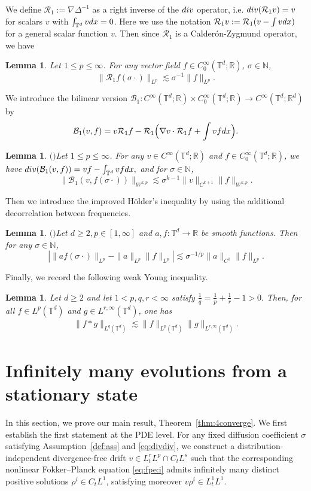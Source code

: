 \documentclass[10pt,a4paper]{amsart}
\numberwithin{equation}{section}
\newtheorem{lemma}[theorem]{Lemma}
\def\({{\Big(}}
\def\){{\Big)}}
\def\dif{{\mathord{{\rm d}}}}
\def\geq{\geqslant}
\def\leq{\leqslant}
\def\div{\mathord{{\rm div}}}
\def\({{\Big(}}
\def\){{\Big)}}
\def\dif{{\mathord{{\rm d}}}}
\def\bl{\begin{lemma}}
\def\el{\end{lemma}}
\def\geq{\geqslant}
\def\leq{\leqslant}
\def\div{\mathord{{\rm div}}}
\begin{document}
 We define $\mathcal{R}_1:=\nabla\Delta^{-1}$ as a right
inverse of the $\div$ operator, i.e. $\div(\mathcal{R}_1v) = v$ for scalars $v$ with $\int_{\mathbb{T}^d} v\dif x = 0$.   Here we use the notation  $\mathcal{R}_1v:=\mathcal{R}_1(v-\int v\dif x)$ for a general scalar function $v$. Then  since $\mathcal{R}_1$ is a Calder\'on-Zygmund operator, we have 
\bl\label{bb_1}
 Let $1\leq p \leq\infty$. For any vector field 
$f \in C_0^\infty(\mathbb{T}^d; \mathbb{R})$, $\sigma\in\mathbb{N}$,
$$\|\mathcal{R}_1f(\sigma\cdot)\|_{ L^p}\lesssim\sigma^{-1} \| f\|_{ L^p}.$$
\el
We introduce the  bilinear version $\mathcal{B}_1: C^\infty(\mathbb{T}^d; \mathbb{R}) \times C_0^\infty(\mathbb{T}^d; \mathbb{R})\to C^\infty(\mathbb{T}^d; \mathbb{R}^{d})$  by $$\mathcal{B}_1(v,f)=v\mathcal{R}_1f-\mathcal{R}_1\(\nabla v\cdot\mathcal{R}_{1}f+\int vf\dif x\).$$

\bl$($\cite[Lemma 3.3]{BCDL21}$)$\label{bb1_1}
Let $1 \leq p \leq\infty$. For any $v \in C^\infty(\mathbb{T}^d; \mathbb{R})$ and $f\in C_0^\infty(\mathbb{T}^d; \mathbb{R})$, we have $\div(\mathcal{B}_1(v,f))=vf-\int_{\mathbb{T}^d}vf\dif x,$ and  for $\sigma\in\mathbb{N}$,
$$\|\mathcal{B}_1(v,f(\sigma\cdot))\|_{W^{k,p}}\lesssim\sigma^{k-1}\|v\|_{C^{k+1}}\|f\|_{W^{k,p}}.$$
\el 




 Then we introduce the improved H\"older’s inequality  by using the additional decorrelation between frequencies.
\bl$($\cite[Theorem B.1]{CL22}$)$\label{ihiot}
Let $d\geq2,p \in [1, \infty]$ and $a, f : \mathbb{T}^d \to \mathbb{R}$ be smooth functions. Then for any $\sigma\in\mathbb{N}$,
$$| \|a f(\sigma\cdot)\|_{L^p}-\|a\|_{L^p}\|f\|_{L^p} |\lesssim\sigma^{-1/p}\|a\|_{C^1}\|f\|_{L^p}.$$
\el


Finally, we record the following weak Young inequality.

\begin{lemma} \label{lem:weak-young}
Let $d\geq 2$ and let $1<p,q,r<\infty$ satisfy
$
\frac1q=\frac1p+\frac1r-1>0 .
$
Then, for all $f\in L^p(\mathbb{T}^d)$ and
$g\in L^{r,\infty}(\mathbb{T}^d)$, one has
\begin{align}
\|f*g\|_{L^q(\mathbb{T}^d)}
\lesssim
\|f\|_{L^p(\mathbb{T}^d)}
\|g\|_{L^{r,\infty}(\mathbb{T}^d)} .
\label{eq:hls}
\end{align}
\end{lemma}

\section{Infinitely many evolutions from a stationary state}\label{cogpss3}
In this section, we prove our main result, Theorem~\ref{thm:4converge}. 
We first establish the first statement at the PDE level. 
For any fixed diffusion coefficient $\sigma$ satisfying Assumption~\ref{def:ass} and \eqref{eq:divdiv}, we construct a distribution-independent divergence-free drift $v \in L^r_tL^p \cap C_tL^s$ 
such that the corresponding nonlinear Fokker--Planck equation \eqref{eq:fpe:i} admits infinitely many distinct positive solutions $\rho^i \in C_tL^1$, satisfying moreover $v\rho^i \in L^1_tL^1.$
\end{document}
